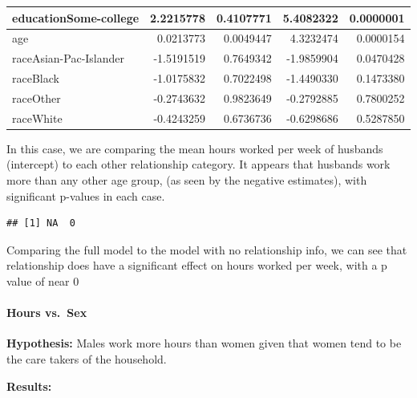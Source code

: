 \documentclass[]{article}
\newenvironment{Shaded}{\begin{snugshade}}{\end{snugshade}}
\newcommand{\KeywordTok}[1]{\textcolor[rgb]{0.13,0.29,0.53}{\textbf{#1}}}
\newcommand{\NormalTok}[1]{#1}
\newcommand{\OperatorTok}[1]{\textcolor[rgb]{0.81,0.36,0.00}{\textbf{#1}}}
\let\oldparagraph\paragraph
\renewcommand{\paragraph}[1]{\oldparagraph{#1}\mbox{}}
\begin{document}
\begin{table}[H]
\begin{tabular}{l|r|r|r|r}
\hline
educationSome-college & 2.2215778 & 0.4107771 & 5.4082322 & 0.0000001\\
\hline
age & 0.0213773 & 0.0049447 & 4.3232474 & 0.0000154\\
\hline
raceAsian-Pac-Islander & -1.5191519 & 0.7649342 & -1.9859904 & 0.0470428\\
\hline
raceBlack & -1.0175832 & 0.7022498 & -1.4490330 & 0.1473380\\
\hline
raceOther & -0.2743632 & 0.9823649 & -0.2792885 & 0.7800252\\
\hline
raceWhite & -0.4243259 & 0.6736736 & -0.6298686 & 0.5287850\\
\hline
\end{tabular}
\end{table}

In this case, we are comparing the mean hours worked per week of
husbands (intercept) to each other relationship category. It appears
that husbands work more than any other age group, (as seen by the
negative estimates), with significant p-values in each case.

\begin{Shaded}
\end{Shaded}

\begin{verbatim}
## [1] NA  0
\end{verbatim}

Comparing the full model to the model with no relationship info, we can
see that relationship does have a significant effect on hours worked per
week, with a p value of near 0

\hypertarget{hours-vs.-sex}{%
\paragraph{Hours vs.~Sex}\label{hours-vs.-sex}}

\textbf{Hypothesis:} Males work more hours than women given that women
tend to be the care takers of the household.

\textbf{Results:}
\end{document}
